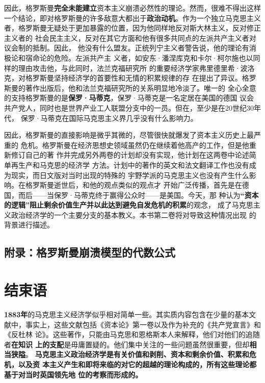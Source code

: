 因此，格罗斯曼\textbf{完全未能建立}资本主义崩溃必然性的理论。然而，很难不得出这样
一个结论，即对格罗斯曼的许多敌意大都出于\textbf{政治动机}。作为一个独立马克思主义
者，格罗斯曼无疑处于更加暴露的位置，因为他同样地反对斯大林主义，反对修正主义者的
社会民主主义，反对在其它方面和他有很多共同点的左派共产主义者对议会制的抵制。因此，
他没有什么盟友。正统列宁主义者警告说，他的理论有消极论和宿命论的危险。左派共产主
义者，如安东·潘涅库克和卡尔·柯尔施也以同样的理由攻击他，与此同时，法兰克福研究所
的重要经济学家弗里德里希·波洛克，对格罗斯曼坚持经济学的首要性和无情的积累规律的存
在提出了异议。格罗斯曼的著作出版后，他和法兰克福研究所的关系明显地冷淡了。唯一的
全心全意的支持格罗斯曼的是\textbf{保罗·马蒂克}，保罗·马蒂克是一名定居在美国的德国
议会共产党人，同时也是世界产业工人联盟分支中的一员。但在，至少是在20世纪30年代，
保罗·马蒂克在国际马克思主义界几乎没有什么影响力。

因此，格罗斯曼的直接影响是微乎其微的，尽管很快就爆发了资本主义历史上最严重的
危机。格罗斯曼在经济思想史领域虽然仍在继续着他高产的工作，但是他重新修订自己的著
作并完成另外两卷的计划却没有实现，他计划在这两卷中论述简单再生产和马克思的经济学
方法。计划中的著作的英文和法文翻译工作也没有成为现实，而日文版对当时出现的特殊的
宇野学派的马克思主义也没有产生什么影响。在格罗斯曼逝世后，和他的观点类似的观点才
开始广泛传播，首先是在德国，而后——当保罗·马蒂克终于赢得公众时——是美国。今天，那
种认为\textbf{“资本的逻辑”阻止剩余价值生产并以此达到避免自发危机的积累}的观念，
成了马克思主义政治经济学的一个主要分支的基本教义。本书第二卷将对导致这种情况出现
的背景进行描述。

\section{附录：格罗斯曼崩溃模型的代数公式}

\chapter*{结束语}

{}

\textbf{1883年}的马克思主义经济学似乎相对简单一些。其实质内容包含在少量的基本文
献中，事实上，这些文献包括《资本论》第一卷以及作为补充的《共产党宣言》和《反杜林
论》。这些著作，只能由马克思和恩格斯本人来解释，他们对他们的追随者\textbf{在知识
上的支配}是毋庸置疑的。他们集中关注的一些问题虽然很重要，但却\textbf{相当狭隘}。
\textbf{马克思主义政治经济学是有关价值和剥削、资本和剩余价值、积累和危机，以及资
本主义产生和即将来临的对它的超越的理论构成的，所有这些理论都基于对当时英国领先地
位的考察而形成的。}

